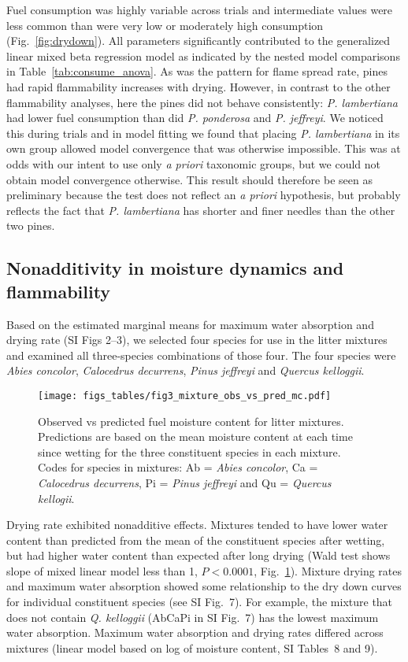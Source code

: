\documentclass[letterpaper,12pt]{article}
\begin{document}
Fuel consumption was highly variable across trials and intermediate values were
less common than were very low or moderately high consumption
(Fig.~\ref{fig:drydown}). All parameters significantly contributed to the
generalized linear mixed beta regression model as indicated by the nested model
comparisons in Table~\ref{tab:consume_anova}. As was the pattern for flame
spread rate, pines had rapid flammability increases with drying. However,
in contrast to the other flammability analyses, here the pines did not behave
consistently: \emph{P. lambertiana} had lower fuel consumption than did \emph{P.
  ponderosa} and \emph{P. jeffreyi}. We noticed this during trials and in model
fitting we found that placing \emph{P. lambertiana} in its own group allowed
model convergence that was otherwise impossible. This was at odds with our
intent to use only \emph{a priori} taxonomic groups, but we could not obtain
model convergence otherwise. This result should therefore be seen as
preliminary because the test does not reflect an \emph{a priori} hypothesis,
but probably reflects the fact that \emph{P. lambertiana} has shorter and finer
needles than the other two pines.

\subsection*{Nonadditivity in moisture dynamics and flammability}

Based on the estimated marginal means for maximum water absorption and drying
rate (SI Figs 2--3), we selected four species for use in the litter mixtures
and examined all three-species combinations of those four. The four species
were \emph{Abies concolor}, \emph{Calocedrus decurrens}, \emph{Pinus jeffreyi}
and \emph{Quercus kelloggii}.

\begin{figure}
  \centering
\texttt{[image: figs\_tables/fig3\_mixture\_obs\_vs\_pred\_mc.pdf]}
\caption{Observed vs predicted fuel moisture content for litter mixtures.
  Predictions are based on the mean moisture content at each time since wetting
  for the three constituent species in each mixture. Codes for species in
  mixtures: Ab = \emph{Abies concolor}, Ca = \emph{Calocedrus decurrens}, Pi =
  \emph{Pinus jeffreyi} and Qu = \emph{Quercus kellogii}.}
  \label{fig:mixture_obs_pred_mc}
\end{figure}


Drying rate exhibited nonadditive effects. Mixtures tended to have lower water
content than predicted from the mean of the constituent species after wetting,
but had higher water content than expected after long drying (Wald test shows
slope of mixed linear model less than 1, $P < 0.0001$,
Fig.~\ref{fig:mixture_obs_pred_mc}). Mixture drying rates and maximum water
absorption showed some relationship to the dry down curves for individual
constituent species (see SI Fig.~7). For example, the mixture that does not
contain \emph{Q. kelloggii} (AbCaPi in SI Fig.~7) has the lowest maximum water
absorption. Maximum water absorption and drying rates differed across mixtures
(linear model based on log of moisture content, SI Tables~8 and 9).
\end{document}

